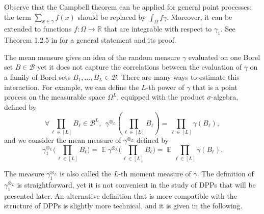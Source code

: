 \documentclass[twoside,11pt]{book}
\numberwithin{theorem}{chapter}
\numberwithin{definition}{chapter}
\numberwithin{proposition}{chapter}
\numberwithin{corollary}{chapter}
\numberwithin{example}{chapter}
\numberwithin{lemma}{chapter}
\DeclareMathOperator{\EX}{\mathbb{E}}
\begin{document}
Observe that the Campbell theorem can be applied for general point processes: the term $\sum\limits_{x \in \gamma} f(x)$ should be replaced by $\int_{\Omega} f \gamma$. Moreover, it can be extended to functions $f: \Omega \rightarrow \mathbb{R}$ that are integrable with respect to $\gamma_1$. See Theorem 1.2.5 in \citep{BaBlKa20} for a general statement and its proof.

The mean measure gives an idea of the random measure $\gamma$ evaluated on one Borel set $B \in \mathcal{B}$ yet it does not capture the correlations between the evaluation of $\gamma$ on a family of Borel sets $B_{1}, \dots, B_{L} \in \mathcal{B}$. There are many ways to estimate this interaction. For example, we can define the $L$-th power of $\gamma$ that is a point process on the measurable space $\Omega^{L}$, equipped with the product $\sigma$-algebra, defined by
\begin{equation}
\forall \prod\limits_{\ell \in [L]} B_{\ell} \in \mathcal{B}^{L}, \:\: \gamma^{\otimes_{L}}(\prod\limits_{\ell \in [L]} B_{\ell}) = \prod\limits_{\ell \in [L]} \gamma(B_{\ell}),
\end{equation}
and we consider the mean measure of  $\gamma^{\otimes_{L}}$ defined by
\begin{equation}
\gamma^{\otimes_{L}}_{1} \big(\prod\limits_{\ell \in [L]} B_\ell \big) = \EX  \gamma^{\otimes_{L}} \big(\prod\limits_{\ell \in [L]} B_\ell \big) = \EX   \prod\limits_{\ell \in [L]} \gamma(B_{\ell}).
\end{equation}



The measure $\gamma_{1}^{\otimes_{L}}$ is also called the $L$-th moment measure of $\gamma$. The definition of $\gamma^{\otimes_{L}}_{1}$ is straightforward, yet it is not convenient in the study of DPPs that will be presented later.  
An alternative definition that is more compatible with the structure of DPPs is slightly more technical, and it is given in the following. 
\end{document}
